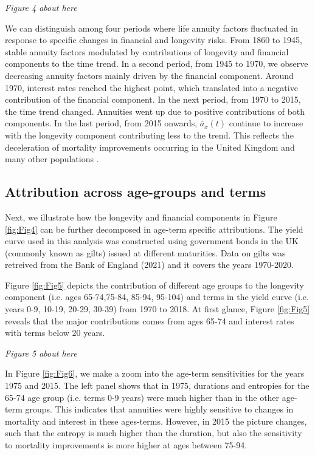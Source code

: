 \documentclass[12pt]{article}
\begin{document}
\begin{center}
	\textit{Figure 4 about here}
\end{center}

We can distinguish among four periods where life annuity factors fluctuated in response to specific changes in financial and longevity risks. From 1860 to 1945, stable annuity factors modulated by  contributions of longevity and financial components to the time trend. In a second period, from 1945 to 1970, we observe decreasing annuity factors mainly driven by the financial component. Around 1970, interest rates reached the highest point, which translated into a negative contribution of the financial component. In the next period, from 1970 to 2015, the time trend changed. Annuities went up due to positive contributions of both components. In the last period, from 2015 onwards, $\bar{a}_x(t)$ continue to increase with the longevity component contributing less to the trend. This reflects the deceleration of mortality improvements occurring in the United Kingdom and many other populations \cite{djeundje2022slowdown}.

\subsection{Attribution across age-groups and terms}

Next, we illustrate how the longevity and financial components in Figure \ref{fig:Fig4} can be further decomposed in age-term specific attributions. The yield curve used in this analysis was constructed using government bonds in the UK (commonly known as gilts) issued at different maturities. Data on gilts was retreived from the Bank of England (2021) and it covers the years 1970-2020.


Figure \ref{fig:Fig5} depicts the contribution of different age groups to the longevity component (i.e. ages 65-74,75-84, 85-94, 95-104) and terms in the yield curve (i.e. years 0-9, 10-19, 20-29, 30-39) from 1970 to 2018. At first glance, Figure \ref{fig:Fig5} reveals that the major contributions comes from ages 65-74 and interest rates with terms below 20 years. 

\begin{center}
	\textit{Figure 5 about here}
\end{center}

In Figure \ref{fig:Fig6}, we make a zoom into the age-term sensitivities for the years 1975 and 2015. The left panel shows that in 1975, durations and entropies for the 65-74 age group (i.e. terms 0-9 years) were much higher than in the other age-term groups. This indicates that annuities were highly sensitive to changes in mortality and interest in these ages-terms. However, in 2015 the picture changes, such that the entropy is much higher than the duration, but also the sensitivity to mortality improvements is more higher at ages between 75-94.
\end{document}
